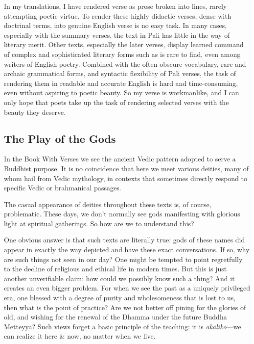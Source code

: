 \documentclass[12pt,openany]{book}%
\begin{document}
In my translations, I have rendered verse as prose broken into lines, rarely attempting poetic virtue. To render these highly didactic verses, dense with doctrinal terms, into genuine English verse is no easy task. In many cases, especially with the summary verses, the text in Pali has little in the way of literary merit. Other texts, especially the later verses, display learned command of complex and sophisticated literary forms such as is rare to find, even among writers of English poetry. Combined with the often obscure vocabulary, rare and archaic grammatical forms, and syntactic flexibility of Pali verses, the task of rendering them in readable and accurate English is hard and time-consuming, even without aspiring to poetic beauty. So my verse is workmanlike, and I can only hope that poets take up the task of rendering selected verses with the beauty they deserve.

\subsection*{The Play of the Gods}

In the Book With Verses we see the ancient Vedic pattern adopted to serve a Buddhist purpose. It is no coincidence that here we meet various deities, many of whom hail from Vedic mythology, in contexts that sometimes directly respond to specific Vedic or brahmanical passages.

The casual appearance of deities throughout these texts is, of course, problematic. These days, we don’t normally see gods manifesting with glorious light at spiritual gatherings. So how are we to understand this?

One obvious answer is that such texts are literally true: gods of these names did appear in exactly the way depicted and have these exact conversations. If so, why are such things not seen in our day? One might be tempted to point regretfully to the decline of religious and ethical life in modern times. But this is just another unverifiable claim: how could we possibly know such a thing? And it creates an even bigger problem. For when we see the past as a uniquely privileged era, one blessed with a degree of purity and wholesomeness that is lost to us, then what is the point of practice? Are we not better off pining for the glories of old, and wishing for the renewal of the Dhamma under the future Buddha Metteyya? Such views forget a basic principle of the teaching: it is \textit{\textsanskrit{akāliko}}—we can realize it here \& now, no matter when we live.
\end{document}
